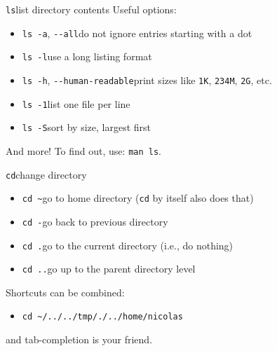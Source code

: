 \documentclass[10pt, aspectratio=169]{beamer}
\let\cmd=\lstinline
\begin{document}
\begin{frame}
  \vfill
  {\huge\cmd{ls}\quad list directory contents}
  \vfill
  Useful options:\\[2mm]
  \begin{itemize}
    \item \cmd{ls -a}, \cmd{--all}\quad do not ignore entries starting with a dot
    \item \cmd{ls -l}\quad use a long listing format
    \item \cmd{ls -h}, \cmd{--human-readable}\quad print sizes like \texttt{1K}, \texttt{234M}, \texttt{2G}, etc.
    \item \cmd{ls -1}\quad list one file per line
    \item \cmd{ls -S}\quad sort by size, largest first
  \end{itemize}
  \vfill
  And more! To find out, use: \cmd{man ls}.
\end{frame}

\begin{frame}
  \vfill
  {\huge\cmd{cd}\quad change directory}
  \vfill
  \begin{itemize}
    \item \cmd{cd ~}\quad go to home directory (\cmd{cd} by itself also does that)
    \item \cmd{cd -}\quad go back to previous directory
    \item \cmd{cd .}\quad go to the current directory (i.e., do nothing)
    \item \cmd{cd ..}\quad go up to the parent directory level
  \end{itemize}
  \vfill
  Shortcuts can be combined:
  \vfill
  \begin{itemize}
    \item\cmd{cd ~/../../tmp/./../home/nicolas}
  \end{itemize}
  \vfill
  and tab-completion is your friend.
  \vfill
\end{frame}
\end{document}
